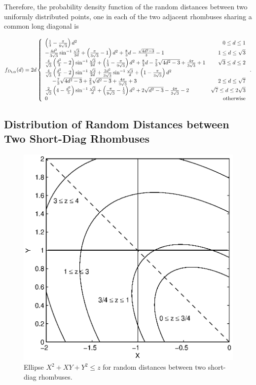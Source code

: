 \documentclass[12pt,draftclsnofoot,onecolumn]{IEEEtran}
\begin{document}
Therefore, the probability density function of the random distances between two
uniformly distributed points, one in each of the two adjacent rhombuses sharing
a common long diagonal is
\begin{small}
\begin{equation}\label{eq:fd_r_diag1}
  f_{D_{\rm LD}}(d)=2d\left\{
    \begin{array}{lr}

\left(\frac{1}{3}-\frac{\pi}{9\sqrt{3}}\right)d^2 & 0\leq d\leq 1\\

-\frac{4d^2}{3\sqrt{3}}\sin^{-1}\frac{\sqrt{3}}{2d}+\left(\frac{\pi}{3\sqrt{3}}
-1\right)d^2+\frac{8}{3}d-\frac{\sqrt{4d^2-3}}{3}-1 & 1\leq d\leq \sqrt{3}\\

\frac{4}{\sqrt{3}}\left(\frac{d^2}{3}-2\right)\sin^{-1}\frac{\sqrt{3
}}{2d}+\left(\frac{1}{3}-\frac{\pi}{9\sqrt{3}}\right)d^2+\frac{8}{3}d-\frac{7}{3
}\sqrt{4d^2-3}+\frac{4\pi}{3\sqrt{3}}+1 & \sqrt{3}\leq d\leq 2\\

\frac{4}{\sqrt{3}}\left(\frac{d^2}{3}-2\right)\sin^{-1}\frac{\sqrt{3
}}{2d}+\frac{2d^2}{3\sqrt{3}}\sin^{-1}\frac{\sqrt{3}}{d}+\left(1-\frac{\pi}{
3\sqrt{3}}\right)d^2 \\
~~~~-\frac{7}{3}\sqrt{4d^2-3}+\frac{2}{3}\sqrt{d^2-3}+\frac{4\pi}{3\sqrt{3}}+3 &
2\leq d\leq \sqrt{7} \\

\frac{2}{\sqrt{3}}\left(4-\frac{d^2}{3}\right)\sin^{-1}\frac{\sqrt{3}}{d}
+\left(\frac{\pi}{9\sqrt{3}}-\frac{1}{3}\right)d^2+2\sqrt{d^2-3}-\frac{4\pi}{
3\sqrt{3}}-2 & \sqrt{7} \leq d \leq 2\sqrt{3} \\

      0 & {\rm otherwise}
    \end{array}
  \right..
\end{equation}
\end{small}

\subsection{Distribution of Random Distances between Two Short-Diag Rhombuses}

\begin{figure}
  \centering
  \includegraphics[width=0.5\columnwidth]{fig/rhombus_diag2}
  \caption{Ellipse $X^2+XY+Y^2 \leq z$ for random distances between two short-diag rhombuses.}
  \label{fig:diag2}
\end{figure}
\end{document}

